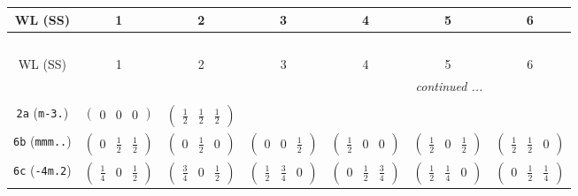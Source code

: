 \documentclass[fleqn,9pt,landscape]{jsarticle}
\begin{document}
\begin{center}
\renewcommand{\arraystretch}{1.2}
\begin{longtable}{ccccccc}
 \hline \hline
WL (SS) & 1 & 2 & 3 & 4 & 5 & 6 \\ \hline \endfirsthead

\multicolumn{6}{l}{\tablename\ \thetable{}} \\
 \hline \hline
WL (SS) & 1 & 2 & 3 & 4 & 5 & 6 \\ \hline \endhead

 \hline \hline
\multicolumn{6}{r}{\footnotesize\it continued ...} \\ \endfoot

 \hline \hline
\multicolumn{6}{r}{} \\ \endlastfoot

{\tt 2a} ({\tt m-3.}) & $ \begin{pmatrix} 0 & 0 & 0 \end{pmatrix} $ & $ \begin{pmatrix} \frac{1}{2} & \frac{1}{2} & \frac{1}{2} \end{pmatrix} $ & $  $ & $  $ & $  $ & $  $ \\ \hline
{\tt 6b} ({\tt mmm..}) & $ \begin{pmatrix} 0 & \frac{1}{2} & \frac{1}{2} \end{pmatrix} $ & $ \begin{pmatrix} 0 & \frac{1}{2} & 0 \end{pmatrix} $ & $ \begin{pmatrix} 0 & 0 & \frac{1}{2} \end{pmatrix} $ & $ \begin{pmatrix} \frac{1}{2} & 0 & 0 \end{pmatrix} $ & $ \begin{pmatrix} \frac{1}{2} & 0 & \frac{1}{2} \end{pmatrix} $ & $ \begin{pmatrix} \frac{1}{2} & \frac{1}{2} & 0 \end{pmatrix} $ \\ \hline
{\tt 6c} ({\tt -4m.2}) & $ \begin{pmatrix} \frac{1}{4} & 0 & \frac{1}{2} \end{pmatrix} $ & $ \begin{pmatrix} \frac{3}{4} & 0 & \frac{1}{2} \end{pmatrix} $ & $ \begin{pmatrix} \frac{1}{2} & \frac{3}{4} & 0 \end{pmatrix} $ & $ \begin{pmatrix} 0 & \frac{1}{2} & \frac{3}{4} \end{pmatrix} $ & $ \begin{pmatrix} \frac{1}{2} & \frac{1}{4} & 0 \end{pmatrix} $ & $ \begin{pmatrix} 0 & \frac{1}{2} & \frac{1}{4} \end{pmatrix} $ \\ \hline

\end{longtable}
\end{center}
\end{document}

